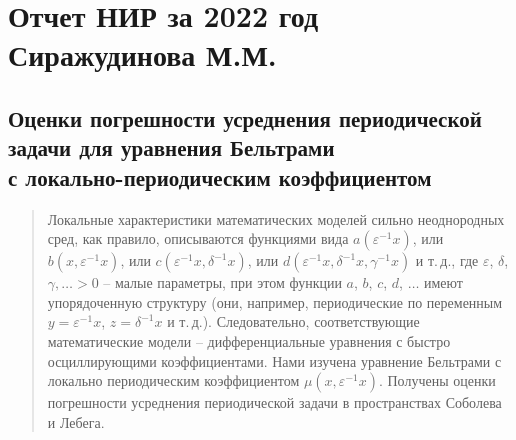 
  \chapter{Отчет НИР за 2022 год Сиражудинова М.М.}

\section{Оценки погрешности усреднения периодической \\ задачи  для уравнения Бельтрами\\
	с локально-периодическим коэффициентом}
\begin{abstract}
Локальные характеристики математических моделей сильно неоднородных сред, как правило, описываются функциями вида $a(\varepsilon^{-1} x)$, или $b(x,\varepsilon^{-1} x)$, или $c(\varepsilon^{-1} x,\delta^{-1} x)$, \linebreak или $d(\varepsilon^{-1} x,\delta^{-1} x,\gamma^{-1} x)$ и т.\,д., где $\varepsilon$, $\delta$,$\gamma,\ldots>0$ – малые параметры, при этом функции $a$, $b$, $c$, $d$, $\ldots$ имеют упорядоченную структуру (они, например, периодические по переменным $y=\varepsilon^{-1} x$, $z=\delta^{-1} x$  и т.\,д.). Следовательно, соответствующие математические модели – дифференциальные уравнения с быстро осциллирующими коэффициентами.
Нами изучена уравнение Бельтрами с локально периодическим коэффициентом $\mu(x,\varepsilon^{-1} x)$. Получены оценки
погрешности усреднения периодической задачи в пространствах Соболева и Лебега.
\end{abstract}



